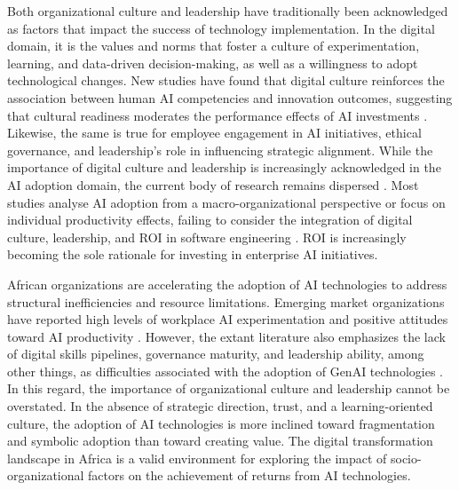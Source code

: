 \documentclass[11pt]{report}
\begin{document}
Both organizational culture and leadership have traditionally been acknowledged as factors that impact the success of technology implementation. In the digital domain, it is the values and norms that foster a culture of experimentation, learning, and data-driven decision-making, as well as a willingness to adopt technological changes. New studies have found that digital culture reinforces the association between human AI competencies and innovation outcomes, suggesting that cultural readiness moderates the performance effects of AI investments \autocite{An2024}. Likewise, the same is true for employee engagement in AI initiatives, ethical governance, and leadership's role in influencing strategic alignment. While the importance of digital culture and leadership is increasingly acknowledged in the AI adoption domain, the current body of research remains dispersed \autocite{An2024}. Most studies analyse AI adoption from a macro-organizational perspective or focus on individual productivity effects, failing to consider the integration of digital culture, leadership, and ROI in software engineering \autocite{Peng2023}. ROI is increasingly becoming the sole rationale for investing in enterprise AI initiatives.

African organizations are accelerating the adoption of AI technologies to address structural inefficiencies and resource limitations. Emerging market organizations have reported high levels of workplace AI experimentation and positive attitudes toward AI productivity \autocite{Gillespie2025}. However, the extant literature also emphasizes the lack of digital skills pipelines, governance maturity, and leadership ability, among other things, as difficulties associated with the adoption of GenAI technologies \autocite{Hughes2026}. In this regard, the importance of organizational culture and leadership cannot be overstated. In the absence of strategic direction, trust, and a learning-oriented culture, the adoption of AI technologies is more inclined toward fragmentation and symbolic adoption than toward creating value. The digital transformation landscape in Africa is a valid environment for exploring the impact of socio-organizational factors on the achievement of returns from AI technologies.
\end{document}
